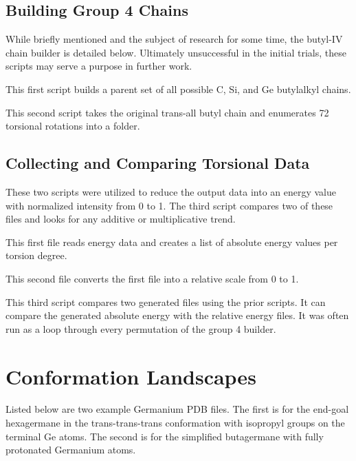 \section{Building Group 4 Chains}

While briefly mentioned and the subject of research for some time, the butyl-IV chain builder is detailed below. 
Ultimately unsuccessful in the initial trials, these scripts may serve a purpose in further work.

This first script builds a parent set of all possible C, Si, and Ge butylalkyl chains.



This second script takes the original trans-all butyl chain and enumerates 72 torsional rotations into a folder.



\section{Collecting and Comparing Torsional Data}

These two scripts were utilized to reduce the output data into an energy value with normalized intensity from 0 to 1. The third script compares two of these files and looks for any additive or multiplicative trend.

This first file reads energy data and creates a list of absolute energy values per torsion degree.


This second file converts the first file into a relative scale from 0 to 1.


This third script compares two generated files using the prior scripts. It can compare the generated absolute energy with the relative energy files. It was often run as a loop through every permutation of the group 4 builder.




\chapter{Conformation Landscapes}
\label{ch:App:ConfLand}

Listed below are two example Germanium PDB files. The first is for the end-goal hexagermane in the trans-trans-trans conformation with isopropyl groups on the terminal Ge atoms. The second is for the simplified butagermane with fully protonated Germanium atoms.

